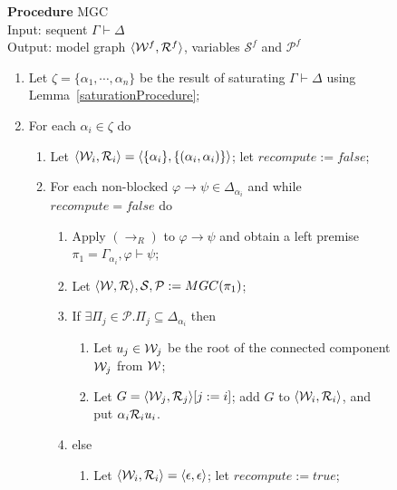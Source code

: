 \documentclass{llncs}
\numberwithin{equation}{section}
\newcommand{\pair}[2]{\langle #1, #2\rangle}
\newcommand{\Pred}{{\mathcal{P}}}
\newcommand{\Succ}{{\mathcal{S}}}
\newcommand{\sequent}{\vdash}
\newcommand{\Imp}{\rightarrow}
\newcommand{\mycal}[1]{
        {\cal{#1}}
}
\newcommand{\ImpRightRule}{({\Imp_R})}
\begin{document}
\begin{figure}[t]
\textbf{Procedure} MGC \\
Input: sequent $\Gamma \sequent \Delta$ \\
Output: model graph $\pair{\mycal{W}^f}{\mycal{R}^f}$, variables $\Succ^f$ and $\Pred^f$
\begin{enumerate}
        \item Let $\zeta = \{ \alpha_1, \cdots, \alpha_n \}$ be the result of saturating $\Gamma \sequent \Delta$ using Lemma~\ref{saturationProcedure};
        \item\label{eachSaturatedVersion} For each $\alpha_i \in \zeta$ do 
                \begin{enumerate}
                \item Let $\pair{\mycal{W}_i}{\mycal{R}_i} = \pair{\{\alpha_i\}}{\{(\alpha_i, \alpha_i)\}}$; let $recompute := false$;
                \item\label{futureWorldConstruction} For each non-blocked $\varphi \Imp \psi \in \Delta_{\alpha_i}$ and while $recompute = false$ do
                \begin{enumerate}
                        \item\label{startSuccConstr} Apply $\ImpRightRule$ to $\varphi \Imp \psi$ and obtain a left premise $\pi_1 = \Gamma_{\alpha_i}, \varphi \sequent \psi$;
                        \item Let $\pair{\mycal{W}}{\mycal{R}}, \Succ, \Pred := MGC(\pi_1)$;
                        \item If $\exists \Pi_j \in \Pred . \Pi_j \subseteq \Delta_{\alpha_i}$ then
                        \begin{enumerate}
                                \item\label{chooseSuccessor} Let $u_j \in \mycal{W}_j$ be the root of the connected component $\mycal{W}_j$ from $\mycal{W}$;
                                \item\label{create} Let $G = \pair{\mycal{W}_j}{\mycal{R}_j}[j:=i]$; add $G$ to $\pair{\mycal{W}_i}{\mycal{R}_i}$, and put $\alpha_i \mycal{R}_i u_i$.
                        \end{enumerate}
                        \item\label{newInfo} else
                        \begin{enumerate}
                                \item\label{delete} Let $\pair{\mycal{W}_i}{\mycal{R}_i} = \pair{\epsilon}{\epsilon}$; let $recompute := true$; 

\end{enumerate}
\end{enumerate}
\end{enumerate}
\end{enumerate}
\end{figure}
\end{document}
